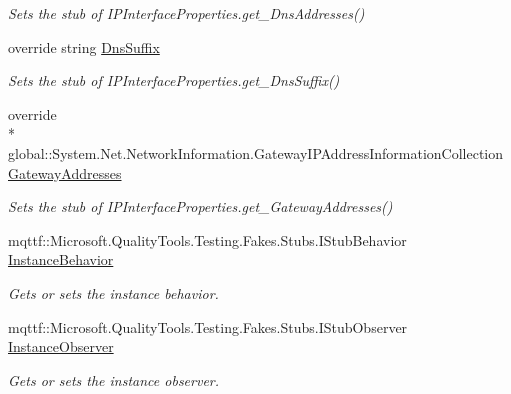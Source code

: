 \begin{DoxyCompactItemize}
\begin{DoxyCompactList}\small\item\em Sets the stub of I\-P\-Interface\-Properties.\-get\-\_\-\-Dns\-Addresses()\end{DoxyCompactList}\item 
override string \hyperlink{class_system_1_1_net_1_1_network_information_1_1_fakes_1_1_stub_i_p_interface_properties_a9fbb04f62687f312af8669a34e7a0c19}{Dns\-Suffix}
\begin{DoxyCompactList}\small\item\em Sets the stub of I\-P\-Interface\-Properties.\-get\-\_\-\-Dns\-Suffix()\end{DoxyCompactList}\item 
override \\*
global\-::\-System.\-Net.\-Network\-Information.\-Gateway\-I\-P\-Address\-Information\-Collection \hyperlink{class_system_1_1_net_1_1_network_information_1_1_fakes_1_1_stub_i_p_interface_properties_a63bdff3d0d3daba58003b28c9e8696b5}{Gateway\-Addresses}
\begin{DoxyCompactList}\small\item\em Sets the stub of I\-P\-Interface\-Properties.\-get\-\_\-\-Gateway\-Addresses()\end{DoxyCompactList}\item 
mqttf\-::\-Microsoft.\-Quality\-Tools.\-Testing.\-Fakes.\-Stubs.\-I\-Stub\-Behavior \hyperlink{class_system_1_1_net_1_1_network_information_1_1_fakes_1_1_stub_i_p_interface_properties_a75ade947c30fe3e4645b0a302361a4c7}{Instance\-Behavior}
\begin{DoxyCompactList}\small\item\em Gets or sets the instance behavior.\end{DoxyCompactList}\item 
mqttf\-::\-Microsoft.\-Quality\-Tools.\-Testing.\-Fakes.\-Stubs.\-I\-Stub\-Observer \hyperlink{class_system_1_1_net_1_1_network_information_1_1_fakes_1_1_stub_i_p_interface_properties_a07a861ee12f1e3562c1f7d3488fcfc08}{Instance\-Observer}
\begin{DoxyCompactList}\small\item\em Gets or sets the instance observer.\end{DoxyCompactList}\item 

\end{DoxyCompactItemize}
